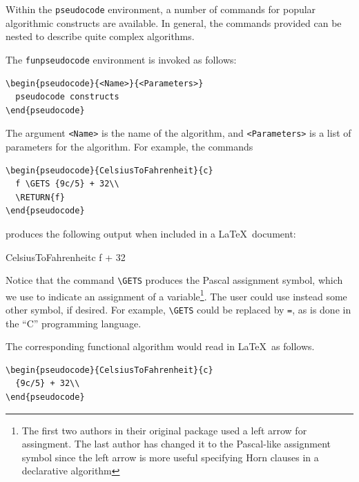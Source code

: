 \documentclass[a4]{article}
\newcommand{\keyword}[1]{\texttt{#1}}
\begin{document}
Within the \keyword{pseudocode} environment, a number of commands for 
popular algorithmic constructs are available.
In general, the commands provided can be nested to
describe quite complex algorithms. 

The \keyword{funpseudocode} environment is  invoked
as follows:
\begin{verbatim}
\begin{pseudocode}{<Name>}{<Parameters>}
  pseudocode constructs
\end{pseudocode}
\end{verbatim}

\noindent{}The argument \verb+<Name>+ is the name of the algorithm,
and \verb+<Parameters>+ is a list of parameters for the algorithm.
For example, the commands

\begin{verbatim}
\begin{pseudocode}{CelsiusToFahrenheit}{c}
  f \GETS {9c/5} + 32\\
  \RETURN{f}
\end{pseudocode}
\end{verbatim}

\noindent{}produces the following output when included in
a \LaTeX\  document:

\begin{pseudocode}{CelsiusToFahrenheit}{c}
  f  + 32\\
\end{pseudocode}

Notice that the command \verb+\GETS+ produces the Pascal assignment
symbol, which we use to indicate an assignment of a
variable\footnote{The first two authors in their original package used
  a left arrow for assingment. The last author has changed it to the
  Pascal-like assignment symbol since the left arrow is more useful
  specifying Horn clauses in a declarative algorithm}. The user
could use instead some other symbol, if desired.  For example,
\verb+\GETS+ could be replaced by \verb+=+, as is done in the ``C''
programming language.

The corresponding functional algorithm would read in  \LaTeX\ as
follows.

\begin{verbatim}
\begin{pseudocode}{CelsiusToFahrenheit}{c}
  {9c/5} + 32\\
\end{pseudocode}
\end{verbatim}
\end{document}
